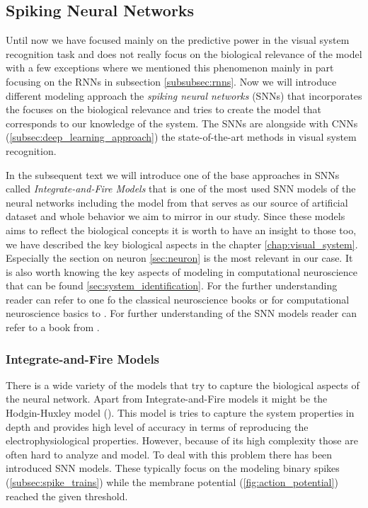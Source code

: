 \subsection{Spiking Neural Networks}
\label{subsec:spiking_neural_nets}
Until now we have focused mainly on the predictive power in the visual system recognition task and does not really focus on the biological relevance of the model with a few exceptions where we mentioned this phenomenon mainly in part focusing on the RNNs in subsection \ref{subsubsec:rnns}. Now we will introduce different modeling approach the \emph{spiking neural networks} (SNNs) that incorporates the focuses on the biological relevance and tries to create the model that corresponds to our knowledge of the system. The SNNs are alongside with CNNs (\ref{subsec:deep_learning_approach}) the state-of-the-art methods in visual system recognition.

In the subsequent text we will introduce one of the base approaches in SNNs called \emph{Integrate-and-Fire Models} that is one of the most used SNN models of the neural networks including the model from \citet{antolik2024comprehensive} that serves as our source of artificial dataset and whole behavior we aim to mirror in our study. Since these models aims to reflect the biological concepts it is worth to have an insight to those too, we have described the key biological aspects in the chapter \ref{chap:visual_system}. Especially the section on neuron \ref{sec:neuron} is the most relevant in our case. It is also worth knowing the key aspects of modeling in computational neuroscience that can be found \ref{sec:system_identification}. For the further understanding reader can refer to one fo the classical neuroscience books \citet{bear2020neuroscience} or for computational neuroscience basics to \citet{dayan2005theoretical}. For further understanding of the SNN models reader can refer to a book from \citet{gerstner2002spiking}.

\subsubsection{Integrate-and-Fire Models}
\label{subsubsec:integrate_and_fire}
There is a wide variety of the models that try to capture the biological aspects of the neural network. Apart from Integrate-and-Fire models it might be the Hodgin-Huxley model (\citet{hodgkin1952quantitative}). This model is tries to capture the system properties in depth and provides high level of accuracy in terms of reproducing the electrophysiological properties. However, because of its high complexity those are often hard to analyze and model. To deal with this problem there has been introduced SNN models. These typically focus on the modeling binary spikes (\ref{subsec:spike_trains}) while the membrane potential (\ref{fig:action_potential}) reached the given threshold.

